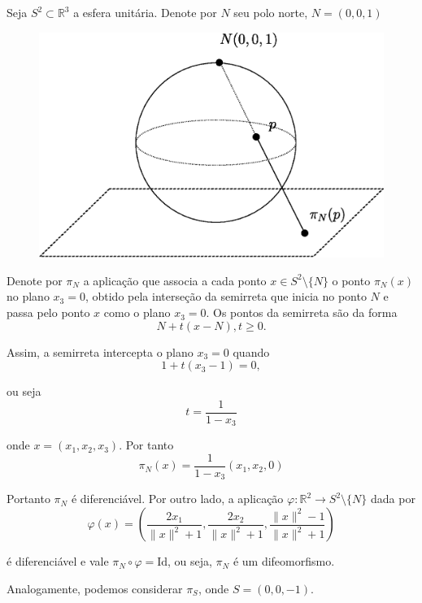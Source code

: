 \begin{exemplo}
Seja $S^2 \subset \mathbb{R}^3$ a esfera unitária. Denote por $N$ seu polo norte, $N = (0,0,1)$

\begin{figure}
	\centering
	\includegraphics[scale=0.5]{graficos/projecao_estereografica.eps}
\end{figure}

Denote por $\pi_N$ a aplicação que associa a cada ponto $x \in S^2 \setminus \{N\}$ o ponto $\pi_N(x)$ no plano $x_3 = 0$, obtido pela interseção da semirreta que inicia no ponto $N$ e passa pelo ponto $x$ como o plano $x_3 = 0$. Os pontos da semirreta são da forma
\begin{equation*}
    N + t(x - N), t \geq 0.
\end{equation*}

Assim, a semirreta intercepta o plano $x_3 = 0$ quando
\begin{equation*}
    1 + t(x_3 - 1) = 0,
\end{equation*}

ou seja
\begin{equation*}
    t = \frac{1}{1 - x_3}
\end{equation*}

onde $x = (x_1, x_2, x_3)$. Por tanto
\begin{equation*}
    \pi_N(x) = \frac{1}{1-x_3} (x_1, x_2, 0)
\end{equation*}

Portanto $\pi_N$ é diferenciável. Por outro lado, a aplicação $\varphi: \mathbb{R}^2 \rightarrow S^2 \setminus \{N\}$ dada por
\begin{equation*}
	\varphi(x) = \left( \frac{2x_1}{\|x\|^2 + 1}, \frac{2x_2}{\|x\|^2 +1}, \frac{\|x\|^2 -1}{\|x\|^2 +1} \right)
\end{equation*} 

é diferenciável e vale $\pi_N \circ \varphi = \text{Id}$, ou seja, $\pi_N$ é um difeomorfismo.

Analogamente, podemos considerar $\pi_S$, onde $S=(0,0,-1)$.
\end{exemplo}

